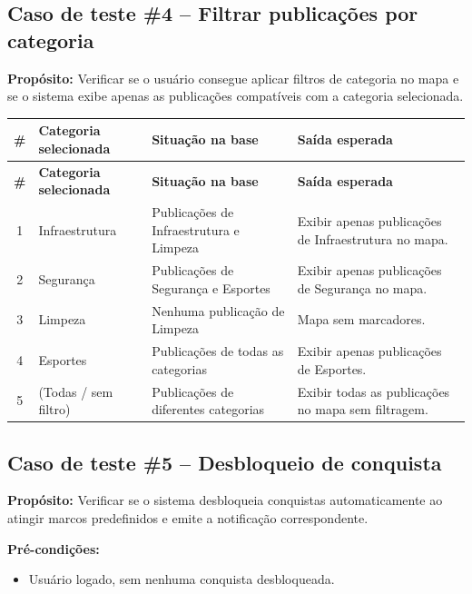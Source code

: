 \subsection*{Caso de teste \#4 – Filtrar publicações por categoria}

\textbf{Propósito:} Verificar se o usuário consegue aplicar filtros de categoria
no mapa e se o sistema exibe apenas as publicações compatíveis com a
categoria selecionada.

\begin{longtable}{|c|p{3cm}|p{4cm}|p{4.5cm}|}
  \hline
  \textbf{\#} & \textbf{Categoria selecionada} & \textbf{Situação na base} & \textbf{Saída esperada} \\
  \hline
  \endfirsthead
  \hline
  \textbf{\#} & \textbf{Categoria selecionada} & \textbf{Situação na base} & \textbf{Saída esperada} \\
  \hline
  \endhead
  1 & Infraestrutura & Publicações de Infraestrutura e Limpeza & Exibir apenas publicações de Infraestrutura no mapa. \\
  \hline
  2 & Segurança & Publicações de Segurança e Esportes & Exibir apenas publicações de Segurança no mapa. \\
  \hline
  3 & Limpeza & Nenhuma publicação de Limpeza & Mapa sem marcadores. \\
  \hline
  4 & Esportes & Publicações de todas as categorias & Exibir apenas publicações de Esportes. \\
  \hline
  5 & (Todas / sem filtro) & Publicações de diferentes categorias & Exibir todas as publicações no mapa sem filtragem. \\
  \hline
\end{longtable}

\subsection*{Caso de teste \#5 – Desbloqueio de conquista}

\textbf{Propósito:} Verificar se o sistema desbloqueia conquistas automaticamente
ao atingir marcos predefinidos e emite a notificação correspondente.

\textbf{Pré-condições:}
\begin{itemize}
  \item Usuário logado, sem nenhuma conquista desbloqueada.
\end{itemize}

